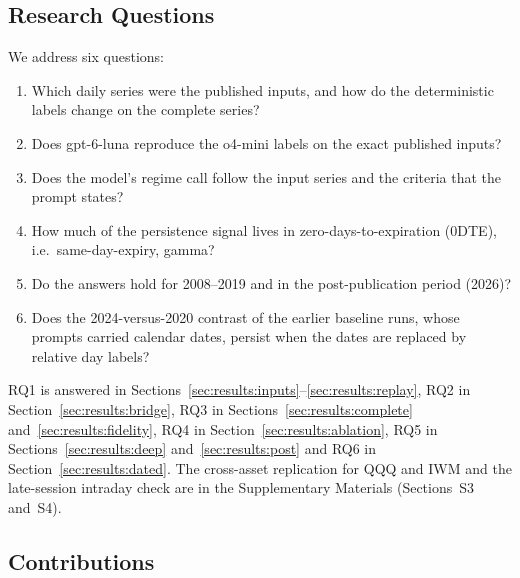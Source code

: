 \subsection{Research Questions}
\label{sec:introduction:rqs}

We address six questions:
\begin{enumerate}[label=RQ\arabic*.,leftmargin=*]
\item Which daily series were the published inputs, and how do the deterministic labels change on the complete series?
\item Does gpt-6-luna reproduce the o4-mini labels on the exact published inputs?
\item Does the model's regime call follow the input series and the criteria that the prompt states?
\item How much of the persistence signal lives in zero-days-to-expiration (0DTE), i.e.\ same-day-expiry, gamma?
\item Do the answers hold for 2008--2019 and in the post-publication period (2026)?
\item Does the 2024-versus-2020 contrast of the earlier baseline runs, whose prompts carried calendar dates, persist when the dates are replaced by relative day labels?
\end{enumerate}
RQ1 is answered in Sections~\ref{sec:results:inputs}--\ref{sec:results:replay}, RQ2 in Section~\ref{sec:results:bridge}, RQ3 in Sections~\ref{sec:results:complete} and~\ref{sec:results:fidelity}, RQ4 in Section~\ref{sec:results:ablation}, RQ5 in Sections~\ref{sec:results:deep} and~\ref{sec:results:post} and RQ6 in Section~\ref{sec:results:dated}. The cross-asset replication for QQQ and IWM and the late-session intraday check are in the Supplementary Materials (Sections~S3 and~S4).

\subsection{Contributions}
\label{sec:introduction:contributions}

